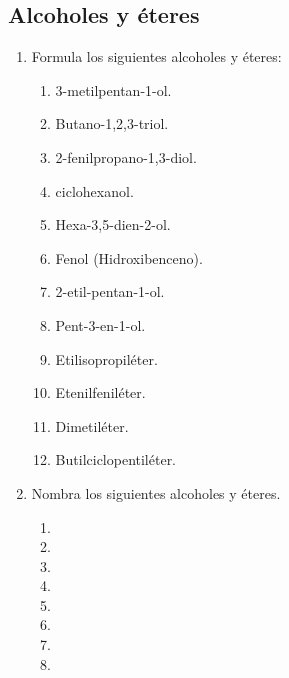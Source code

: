 \subsection*{Alcoholes y éteres}
\begin{enumerate}
    \item Formula los siguientes alcoholes y éteres:
          \begin{enumerate}
              \item 3-metilpentan-1-ol.
              \item Butano-1,2,3-triol.
              \item 2-fenilpropano-1,3-diol.
              \item ciclohexanol.
              \item Hexa-3,5-dien-2-ol.
              \item Fenol (Hidroxibenceno).
              \item 2-etil-pentan-1-ol.
              \item Pent-3-en-1-ol.
              \item Etilisopropiléter.
              \item Etenilfeniléter.
              \item Dimetiléter.
              \item Butilciclopentiléter.
          \end{enumerate}
    \item Nombra los siguientes alcoholes y éteres.
          \begin{enumerate}
              \item {}
              \item  {}
              \item  {}
              \item {}
              \item {}
              \item {}
              \item {}
              \item {}
          \end{enumerate}
\end{enumerate}
